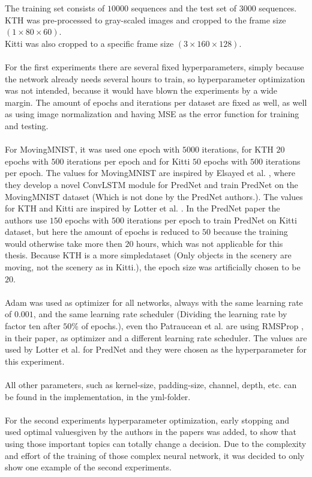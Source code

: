   The training set consists of $10000$ sequences and the test set of $3000$ sequences.\\
  KTH was pre-processed to gray-scaled images and cropped to the frame size $(1 \times 80 \times 60)$.\\
  Kitti was also cropped to a specific frame size $(3 \times 160 \times 128)$.
  \\\\
  For the first experiments there are several fixed hyperparameters, simply because the network already needs several hours to train, so hyperparameter 
  optimization was not intended, because it would have blown the experiments by a wide margin.
  The amount of epochs and iterations per dataset are fixed as well, as well as using image normalization and having MSE as the
  error function for training and testing.
  \\\\
  For MovingMNIST, it was used one epoch with $5000$ iterations, for KTH $20$ epochs with $500$ iterations per epoch and for Kitti $50$ epochs with $500$ 
  iterations per epoch. The values for MovingMNIST are inspired by Elsayed et al. \cite{Elsayed2018}, where they develop a novel ConvLSTM module for PredNet and 
  train PredNet on the MovingMNIST dataset (Which is not done by the PredNet authors.).
  The values for KTH and Kitti are inspired by Lotter et al. \cite{Lotter2016}.
  In the PredNet paper the authors use $150$ epochs with $500$ iterations per epoch to train PredNet on Kitti dataset, but here the amount of epochs is reduced to
  $50$ because the training would otherwise take more then $20$ hours, which was not applicable for this thesis. Because KTH is a more \glqq simple\grqq dataset 
  (Only 
  objects in the scenery are moving, not the scenery as in Kitti.), the epoch size was artificially chosen to be $20$.
  \\\\
  Adam \cite{Kingma2015} was used as optimizer for all networks, always with the same learning rate of $0.001$, and the same learning rate scheduler (Dividing the 
  learning rate by factor ten after $50$\% of epochs.), even tho 
  Patraucean et al. \cite{Patraucean2015} are using RMSProp \cite{Ruder2016}, in their paper, as optimizer and a different learning rate scheduler.
  The values are used by Lotter et al. \cite{Lotter2016} for PredNet and they were chosen as the hyperparameter for this experiment.
  \\\\
  All other parameters, such as kernel-size, padding-size, channel, depth, etc. can be found in the implementation, in the yml-folder.  
  \\\\
  For the second experiments hyperparameter optimization, early stopping and used \glqq optimal values\grqq given by the authors in the papers was added,
  to show that using those important topics can totally change a decision.
  Due to the complexity and effort of the training of those complex neural network, it was decided to only show one example of the second experiments.
  
